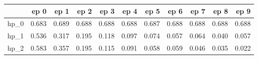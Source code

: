 \begin{tabular}{lrrrrrrrrrr}
\toprule
{} &   ep 0 &   ep 1 &   ep 2 &   ep 3 &   ep 4 &   ep 5 &   ep 6 &   ep 7 &   ep 8 &   ep 9 \\
\midrule
hp\_0 &  0.683 &  0.689 &  0.688 &  0.688 &  0.688 &  0.687 &  0.688 &  0.688 &  0.688 &  0.688 \\
hp\_1 &  0.536 &  0.317 &  0.195 &  0.118 &  0.097 &  0.074 &  0.057 &  0.064 &  0.040 &  0.057 \\
hp\_2 &  0.583 &  0.357 &  0.195 &  0.115 &  0.091 &  0.058 &  0.059 &  0.046 &  0.035 &  0.022 \\
\bottomrule
\end{tabular}
